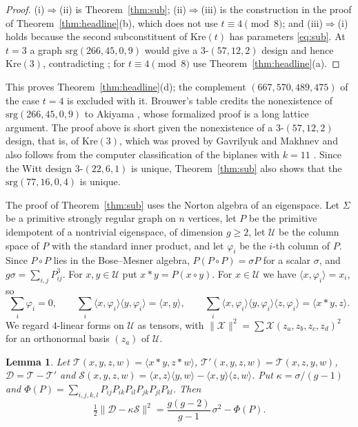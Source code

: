 \documentclass[11pt]{article}
\newtheorem{lemma}[theorem]{Lemma}
\theoremstyle{definition}
\theoremstyle{remark}
\newcommand{\ip}[2]{\langle #1,#2\rangle}
\newcommand{\Kre}{\mathrm{Kre}}
\begin{document}
\begin{proof}
(i)$\Rightarrow$(ii) is Theorem~\ref{thm:sub}; (ii)$\Rightarrow$(iii) is the
construction in the proof of Theorem~\ref{thm:headline}(b), which does not
use $t\equiv4\pmod 8$; and (iii)$\Rightarrow$(i) holds because the second
subconstituent of $\Kre(t)$ has parameters \eqref{eq:sub}. At $t=3$ a graph
$\mathrm{srg}(266,45,0,9)$ would give a $3$-$(57,12,2)$ design and hence
$\Kre(3)$, contradicting \cite{GM,KO}; for $t\equiv4\pmod 8$ use
Theorem~\ref{thm:headline}(a).
\end{proof}

This proves Theorem~\ref{thm:headline}(d); the complement $(667,570,489,475)$
of the case $t=4$ is excluded with it. Brouwer's table credits the
nonexistence of $\mathrm{srg}(266,45,0,9)$ to Akiyama \cite{Akiyama}, whose
formalized proof is a long lattice argument. The proof above is short given
the nonexistence of a $3$-$(57,12,2)$ design, that is, of $\Kre(3)$, which was
proved by Gavrilyuk and Makhnev \cite{GM} and also follows from the computer
classification of the biplanes with $k=11$ \cite{KO}. Since the
Witt design $3$-$(22,6,1)$ is unique, Theorem~\ref{thm:sub} also shows that
the $\mathrm{srg}(77,16,0,4)$ is unique.

The proof of Theorem~\ref{thm:sub} uses the Norton algebra of an eigenspace.
Let $\Sigma$ be a primitive strongly regular graph on $n$ vertices, let $P$
be the primitive idempotent of a nontrivial eigenspace, of dimension $g\ge2$,
let $\mathcal U$ be the column space of $P$ with the standard inner product,
and let $\varphi_i$ be the $i$-th column of $P$. Since $P\circ P$ lies in the
Bose--Mesner algebra, $P(P\circ P)=\sigma P$ for a scalar $\sigma$, and
$g\sigma=\sum_{i,j}P_{ij}^3$. For $x,y\in\mathcal U$ put $x*y=P(x\circ y)$.
For $x\in\mathcal U$ we have $\ip x{\varphi_i}=x_i$, so
\begin{equation}\label{eq:moments}
 \sum_i\varphi_i=0,\qquad \sum_i\ip x{\varphi_i}\ip y{\varphi_i}=\ip xy,\qquad
 \sum_i\ip x{\varphi_i}\ip y{\varphi_i}\ip z{\varphi_i}=\ip{x*y}z .
\end{equation}
We regard $4$-linear forms on $\mathcal U$ as tensors, with
$\|\mathcal X\|^2=\sum\mathcal X(z_a,z_b,z_c,z_d)^2$ for an orthonormal basis
$(z_a)$ of $\mathcal U$.

\begin{lemma}\label{lem:norton}
Let $\mathcal T(x,y,z,w)=\ip{x*y}{z*w}$,
$\mathcal T'(x,y,z,w)=\mathcal T(x,z,y,w)$, $\mathcal D=\mathcal T-\mathcal T'$
and
$\mathcal S(x,y,z,w)=\ip xz\ip yw-\ip xy\ip zw$. Put $\kappa=\sigma/(g-1)$
and $\Phi(P)=\sum_{i,j,k,l}P_{ij}P_{ik}P_{il}P_{jk}P_{jl}P_{kl}$. Then
\[
 \tfrac12\|\mathcal D-\kappa\mathcal S\|^2=\frac{g(g-2)}{g-1}\,\sigma^2-\Phi(P).
\]
\end{lemma}
\end{document}

